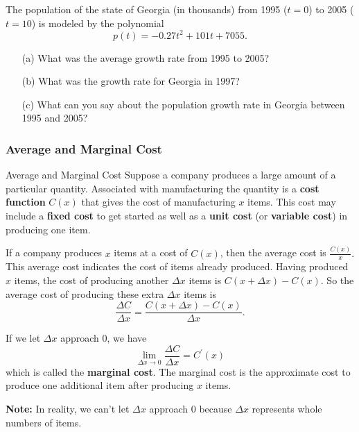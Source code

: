 \documentclass[cal1spr16Lectures.tex]{subfiles}
\begin{document}
\begin{frame}
\begin{exe} The population of the state of Georgia (in thousands) from 1995 ($t=0$) to 2005 ($t=10$) is modeled by the polynomial 
\[p(t)=-0.27t^2+101t+7055.\]
\begin{itemize}
	\item[(a)] What was the average growth rate from 1995 to 2005?
	\item[(b)] What was the growth rate for Georgia in 1997?
	\item[(c)] What can you say about the population growth rate in Georgia between 1995 and 2005?
\end{itemize}
\end{exe}
\end{frame}

\subsubsection{Average and Marginal Cost}

\begin{frame}{\small Average and Marginal Cost}
Suppose a company produces a large amount of a particular quantity.  Associated with manufacturing the quantity is a {\bf cost function} $C(x)$ that gives the cost of manufacturing $x$ items.  This cost may include a {\bf fixed cost} to get started as well as a {\bf unit cost} (or {\bf variable cost}) in producing one item.
\end{frame}

\begin{frame}{}
If a company produces $x$ items at a cost of $C(x)$, then the average cost is $\textstyle\frac{C(x)}{x}.$  This average cost indicates the cost of items already produced.  Having produced $x$ items, the cost of producing another $\Delta x$ items is $C(x+\Delta x)-C(x)$.  So the average cost of producing these extra $\Delta x$ items is 
\[\frac{\Delta C}{\Delta x}=\frac{C(x+\Delta x)-C(x)}{\Delta x}.\]
\end{frame}

\begin{frame}{}
If we let $\Delta x$ approach 0, we have
\[\lim_{\Delta x \to 0}\frac{\Delta C}{\Delta x}=C^{\prime}(x)\]
which is called the {\bf marginal cost}.  The marginal cost is the approximate cost to produce one additional item after producing $x$ items.

\vspace{1pc}
{\bf Note:}  In reality, we can't let $\Delta x$ approach 0 because $\Delta x$ represents whole numbers of items.
\end{frame}
\end{document}
